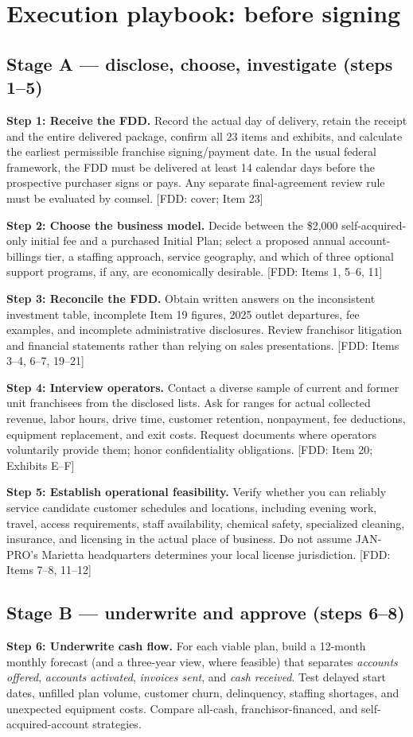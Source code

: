 \documentclass[10pt,letterpaper]{article}
\newcommand{\FDD}[1]{\textsf{\footnotesize\color{Muted} [FDD: #1]}}
\begin{document}
\section{Execution playbook: before signing}
\subsection{Stage A --- disclose, choose, investigate (steps 1--5)}
\textbf{Step 1: Receive the FDD.} Record the actual day of delivery, retain the
receipt and the entire delivered package, confirm all 23 items and exhibits,
and calculate the earliest permissible franchise signing/payment date. In the
usual federal framework, the FDD must be delivered at least 14 calendar days
before the prospective purchaser signs or pays. Any separate final-agreement
review rule must be evaluated by counsel. \FDD{cover; Item 23}

\textbf{Step 2: Choose the business model.} Decide between the \$2,000
self-acquired-only initial fee and a purchased Initial Plan; select a proposed
annual account-billings tier, a staffing approach, service geography, and
which of three optional support programs, if any, are economically desirable.
\FDD{Items 1, 5--6, 11}

\textbf{Step 3: Reconcile the FDD.} Obtain written answers on the inconsistent
investment table, incomplete Item 19 figures, 2025 outlet departures, fee
examples, and incomplete administrative disclosures. Review franchisor
litigation and financial statements rather than relying on sales presentations.
\FDD{Items 3--4, 6--7, 19--21}

\textbf{Step 4: Interview operators.} Contact a diverse sample of current and
former unit franchisees from the disclosed lists. Ask for ranges for actual
collected revenue, labor hours, drive time, customer retention, nonpayment,
fee deductions, equipment replacement, and exit costs. Request documents
where operators voluntarily provide them; honor confidentiality obligations.
\FDD{Item 20; Exhibits E--F}

\textbf{Step 5: Establish operational feasibility.} Verify whether you can
reliably service candidate customer schedules and locations, including evening
work, travel, access requirements, staff availability, chemical safety,
specialized cleaning, insurance, and licensing in the actual place of business.
Do not assume JAN-PRO's Marietta headquarters determines your local license
jurisdiction. \FDD{Items 7--8, 11--12}

\subsection{Stage B --- underwrite and approve (steps 6--8)}
\textbf{Step 6: Underwrite cash flow.} For each viable plan, build a 12-month
monthly forecast (and a three-year view, where feasible) that separates
\emph{accounts offered}, \emph{accounts activated}, \emph{invoices sent}, and
\emph{cash received}. Test delayed start dates, unfilled plan volume, customer
churn, delinquency, staffing shortages, and unexpected equipment costs. Compare
all-cash, franchisor-financed, and self-acquired-account strategies.
\end{document}
